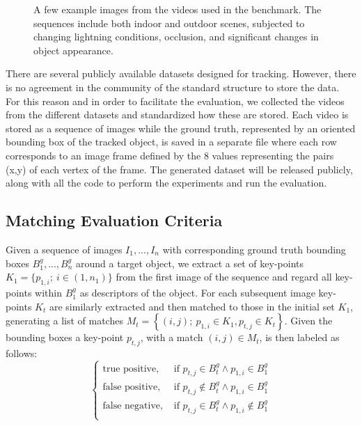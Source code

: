 \begin{figure}[t]
{	
	}
\caption{A few example images from the videos used in the benchmark. The sequences include both indoor and outdoor scenes, subjected to changing lightning conditions, 
occlusion, and significant changes in object appearance.}
\vspace{-3mm}
\label{fig:tracking_results}
\end{figure}


There are several publicly available datasets designed for tracking. However, there is no agreement in the community of the standard structure to store the data. For this reason and in order to facilitate the evaluation, we collected the videos from the different datasets and standardized how these are stored. Each video is stored as a sequence of images while the ground truth, represented by an oriented bounding box of the tracked object, is saved in a separate file where each row corresponds to an image frame defined by the 8 values representing the pairs (x,y) of each vertex of the frame. The generated dataset will be released publicly, along with all the code to perform the experiments and run the evaluation.

\subsection{Matching Evaluation Criteria}
Given a sequence of images $I_{1},...,I_{n}$ with corresponding ground truth bounding boxes $B^g_{1},...,B^g_{n}$ around a target object, we extract a set of key-points $K_1 = \{ p_{1,i}; ~i \in (1,n_1)\}$ from the first image of the sequence and regard all key-points within $B^g_{1}$ as descriptors of the object. For each subsequent image key-points $K_{t}$ are similarly extracted and then matched to those in the initial set $K_{1}$, generating a list of matches $M_t = \left\lbrace (i,j); ~p_{1,i} \in K_1, p_{t,j} \in K_t \right\rbrace$. Given the bounding boxes a key-point $p_{t,j}$, with a match $(i,j)\in M_t$, is then labeled as follows:
\begin{equation}
\begin{cases}
\text{true positive},&  \text{ if } p_{t,j} \in B^g_{t} \land p_{1,i} \in B^g_{1} \\
\text{false positive},&  \text{ if } p_{t,j} \notin B^g_{t} \land p_{1,i} \in B^g_{1} \\
\text{false negative},&  \text{ if } p_{t,j} \in B^g_{t} \land p_{1,i} \notin B^g_{1} \\
\end{cases}
\end{equation}


